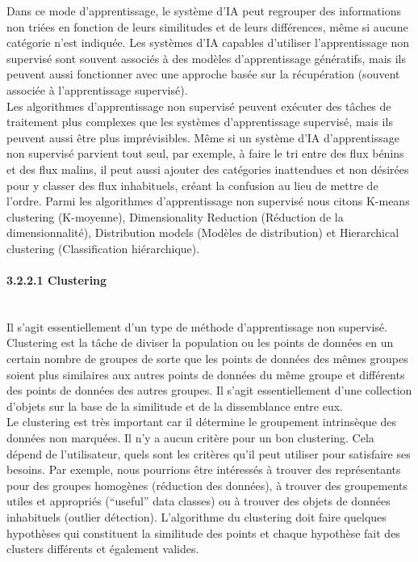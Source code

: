 \noindent Dans ce mode d'apprentissage, le système d'IA peut regrouper des informations non triées en fonction de leurs similitudes et de leurs différences, même si aucune catégorie n'est indiquée. Les systèmes d'IA capables d'utiliser l'apprentissage non supervisé sont souvent associés à des modèles d'apprentissage génératifs, mais ils peuvent aussi fonctionner avec une approche basée sur la récupération (souvent associée à l'apprentissage supervisé).\\

\noindent Les algorithmes d'apprentissage non supervisé peuvent exécuter des tâches de traitement plus complexes que les systèmes d'apprentissage supervisé, mais ils peuvent aussi être plus imprévisibles. Même si un système d'IA d'apprentissage non supervisé parvient tout seul, par exemple, à faire le tri entre des flux bénins et des flux malins, il peut aussi ajouter des catégories inattendues et non désirées pour y classer des flux inhabituels, créant la confusion au lieu de mettre de l'ordre.
Parmi les algorithmes d’apprentissage non supervisé nous citons K-means clustering (K-moyenne), Dimensionality Reduction (Réduction de la dimensionnalité), Distribution models (Modèles de distribution) et Hierarchical clustering (Classification hiérarchique).\\

\newpage
\paragraph{{\large 3.2.2.1 Clustering}\\\\}
Il s'agit essentiellement d'un type de méthode d'apprentissage non supervisé. Clustering est la tâche de diviser la population ou les points de données en un certain nombre de groupes de sorte que les points de données des mêmes groupes soient plus similaires aux autres points de données du même groupe et différents des points de données des autres groupes. Il s'agit essentiellement d'une collection d'objets sur la base de la similitude et de la dissemblance entre eux.\\

\noindent Le clustering est très important car il détermine le groupement intrinsèque des données non marquées. Il n'y a aucun critère pour un bon clustering. Cela dépend de l'utilisateur, quels sont les critères qu'il peut utiliser pour satisfaire ses besoins. Par exemple, nous pourrions être intéressés à trouver des représentants pour des groupes homogènes (réduction des données), à trouver des groupements utiles et appropriés (“useful” data classes) ou à trouver des objets de données inhabituels (outlier détection). L'algorithme du clustering doit faire quelques hypothèses qui constituent la similitude des points et chaque hypothèse fait des clusters différents et également valides. 

